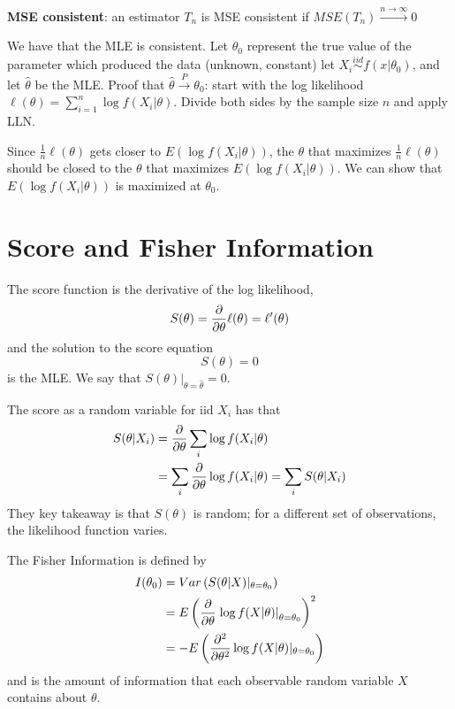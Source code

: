 \documentclass[letterpaper, 8pt]{extarticle}
\begin{document}
\begin{multicols*}{3}
	\textbf{MSE consistent}: an estimator $T_n$ is MSE consistent if $MSE(T_n)\overset{n\to\infty}{\longrightarrow}0$
	
	We have that the MLE is consistent. Let $\theta_0$ represent the true value of the parameter which produced the data (unknown, constant) let $X_i\overset{iid}{\sim} f(x|\theta_0)$, and let $\hat\theta$ be the MLE. Proof that $\hat\theta\overset{P}{\to}\theta_0$: start with the log likelihood $\ell(\theta)=\sum_{i=1}^n\log f(X_i|\theta)$. Divide both sides by the sample size $n$ and apply LLN.
	
	Since $\frac{1}{n}\ell(\theta)$ gets closer to $E(\log f(X_i|\theta))$, the $\theta$ that maximizes $\frac{1}{n}\ell(\theta)$ should be closed to the $\theta$ that maximizes $E(\log f(X_i|\theta))$. We can show that $E(\log f(X_i|\theta))$ is maximized at $\theta_0$.
	
	\section{Score and Fisher Information}
	The score function is the derivative of the log likelihood, 
	\[S(\theta)=\pdv{\theta}\ell(\theta)=\ell'(\theta)\]
	and the solution to the score equation 
	\[S(\theta)=0\]
	is the MLE. We say that $\left.S(\theta)\right|_{\theta=\hat\theta}=0$.
	
	The score as a random variable for iid $X_i$ has that
	\begin{align*}
		S(\theta|X_i)&=\pdv{\theta}\sum_i\log f(X_i|\theta)\\
		&=\sum_i\pdv{\theta}\log f(X_i|\theta)=\sum_iS(\theta|X_i)
	\end{align*}
	They key takeaway is that $S(\theta)$ is random; for a different set of observations, the likelihood function varies. 
	
	The Fisher Information is defined by
	\begin{align*}
		I(\theta_0)&=Var\left(S(\theta|X)|_{\theta=\theta_0}\right)\\
		&=E\left(\pdv{\theta}\left.\log f(X|\theta)\right|_{\theta=\theta_0}\right)^2\\
		&=-E\left(\pdv[2]{\theta}\log f(X|\theta)|_{\theta=\theta_0}\right)
	\end{align*}
	and is the amount of information that each observable random variable $X$ contains about $\theta$.

\end{multicols*}
\end{document}
